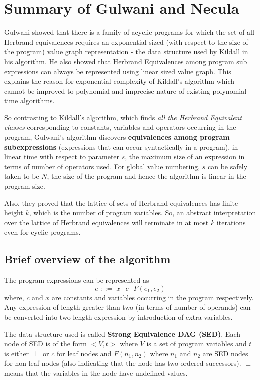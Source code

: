 \chapter{Summary of Gulwani and Necula}
\label{chap:chapter3}

Gulwani showed that there is a family of acyclic programs for which 
the set of all Herbrand equivalences requires an exponential 
sized (with respect to the size of the program) value graph 
representation - the data structure used by Kildall in his algorithm. 
He also showed that Herbrand Equivalences among program sub 
expressions can always be represented using linear sized value graph. 
This explains the reason for exponential complexity of Kildall's 
algorithm which cannot be improved to polynomial and imprecise nature 
of existing polynomial time algorithms.

So contrasting to Kildall's algorithm, which finds \textit{all the 
Herbrand Equivalent classes} corresponding to constants, variables 
and operators occurring in the program, Gulwani's algorithm discovers 
\textbf{equivalences among program subexpressions} (expressions that 
can occur syntactically in a program), in linear time with respect to 
parameter $s$, the maximum size of an expression in terms of number 
of operators used. For global value numbering, $s$ can be safely 
taken to be $N$, the size of the program and hence the algorithm is 
linear in the program size.

Also, they proved that the lattice of sets of Herbrand equivalences has 
finite height $k$, which is the number of program variables. So, an 
abstract interpretation over the lattice of Herbrand equivalences 
will terminate in at most $k$ iterations even for cyclic programs.

\section{Brief overview of the algorithm}
\label{sec:BriefOverviewOfTheAlgorithm}
The program expressions can be represented as
$$e\; ::=\; x\: |\: c\: |\:F(e_1, e_2)$$
where, $c$ and $x$ are constants and variables occurring in the 
program respectively. Any expression of length greater than two
(in terms of number of operands) can be converted into two length 
expression by introduction of extra variables.


The data structure used is called \textbf{Strong Equivalence DAG 
(SED)}. Each node of SED is of the form $<V,t>$ where $V$ is a set of 
program variables and $t$ is either $\perp$ or $c$ for leaf nodes and 
$F(n_1, n_2)$ where $n_1$ and $n_2$ are SED nodes for non leaf nodes
(also indicating that the node has two ordered successors). $\perp$ 
means that the variables in the node have undefined values.

